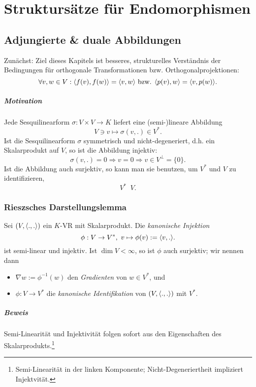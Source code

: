 \chapter{Struktursätze für Endomorphismen}
\section{Adjungierte \& duale Abbildungen}
	Zunächst: Ziel dieses Kapitels ist besseres, strukturelles Verständnis der Bedingungen für orthogonale Transformationen bzw. Orthogonalprojektionen:
		\[ \forall v,w\in V: \langle f(v),f(w) \rangle = \langle v,w \rangle \text{ bzw. } \langle p(v),w \rangle = \langle v,p(w) \rangle. \]
\paragraph{Motivation}
	Jede Sesquilinearform $ \sigma: V\times V\to K $ liefert  eine (semi-)lineare Abbildung
		\[ V\ni v\mapsto \sigma(v,.)\in V^*. \]
	Ist die Sesquilinearform $ \sigma $ symmetrisch und nicht-degeneriert, d.h. ein Skalarprodukt auf $ V $, so ist die Abbildung injektiv:
		\[ \sigma(v,.) = 0 \Rightarrow v = 0 \Rightarrow v\in V^\perp = \{0\}. \]
	Ist die Abbildung auch surjektiv, so kann man sie benutzen, um $ V^* $ und $ V $ zu identifizieren,
		\[ V^* \mathop{\overline{\simeq}} V. \]
\subsection{Rieszsches Darstellungslemma}
\begin{Lemma}
	Sei $ (V,\langle .,. \rangle) $ ein $ K $-VR mit Skalarprodukt. Die \emph{kanonische Injektion}
		\[ \phi : V\to V^*,\ v\mapsto \phi(v):= \langle v,. \rangle. \]
	ist semi-linear und injektiv. Ist $ \dim V < \infty $, so ist $ \phi $ auch surjektiv; wir nennen dann
		\begin{itemize}
			\item $\nabla w := \phi^{-1}(w) $ den \emph{Gradienten} von $ w\in V^* $, und
			\item $ \phi: V\to V^* $ die \emph{kanonische Identifikation} von $ (V,\langle .,. \rangle) $ mit $ V^* $.
		\end{itemize}
\end{Lemma}
\paragraph{Beweis}
	Semi-Linearität und Injektivität folgen sofort aus den Eigenschaften des Skalarprodukts.\footnote{Semi-Linearität in der linken Komponente; Nicht-Degeneriertheit impliziert Injektvität.}
	
